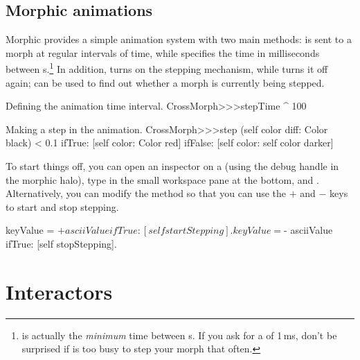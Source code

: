\documentclass[a4paper,10pt,twoside]{book}
\begin{document}
\subsection{Morphic animations}

Morphic provides a simple animation system with two main methods:  is sent to a morph at regular intervals of time, while  specifies the time in milliseconds between s.\footnote{ is actually the \emph{minimum} time between s.   If you ask for a  of 1\,ms, don't be surprised if \sq is too busy to step your morph that often.}
In addition, 
 turns on the stepping mechanism, while  turns it off again;   can be used to find out whether a morph is currently being stepped.

\begin{method}{Defining the animation time interval.}
CrossMorph>>>stepTime
	^ 100
\end{method}
\begin{method}{Making a step in the animation.}
CrossMorph>>>step
	(self color diff: Color black) < 0.1
		ifTrue: [self color: Color red]
		ifFalse: [self color: self color darker]
\end{method}
\noindent
To start things off, you can open an inspector on a  (using the debug handle \debugHandle{} in the morphic halo), type  in the small workspace pane at the bottom, and  .
Alternatively, you can modify the  method so that you can use the $+$ and $-$ keys to start and stop stepping. 


\begin{code}{}
	keyValue = $+ asciiValue 
		ifTrue: [self startStepping].
	keyValue = $- asciiValue
		ifTrue: [self stopStepping].
\end{code}


\section{Interactors}
\end{document}
